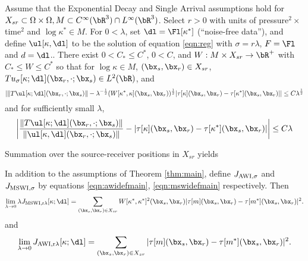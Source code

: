 \begin{theorem}
  \label{thm:main}
  Assume that the Exponential Decay and Single Arrival assumptions
  hold for $X_{sr} \subset \Omega \times \Omega, M \subset C^{\infty}(\bR^3) \cap L^{\infty}(\bR^3)$.
  Select $r >0$ with units of
  pressure$^2 \times$time$^2$ and $\log \kappa^* \in M$. For $0 <
  \lambda $, set
  $\dl=\Fl[\kappa^*]$ (``noise-free data''), and  define $\ul[\kappa,\dl]$
  to be the solution of 
  equation \ref{eqn:reg} with  $\sigma=r\lambda$, $F=\Fl$ and $d=\dl$..
  There exist $0 < C_* \le C^*$, $0 < C$, and $W: M \times X_{sr}
  \rightarrow \bR^+$ with $C_* \le
  W \le C^*$ so that for
  $\log \kappa \in M$, $(\bx_s,\bx_r) \in X_{sr}$, $Tu_{\sigma}[\kappa;\dl](\bx_r,\cdot;\bx_s) \in L^2(\bR)$, and 
  \begin{equation}
    \label{eqn:mswitt}
    |\|T\ul[\kappa;\dl](\bx_r,\cdot;\bx_s)\|- \lambda^{-\frac{1}{2}} (W[\kappa^*,\kappa](\bx_s,\bx_r))^{\frac{1}{2}}|\tau[\kappa](\bx_s,\bx_r)-\tau[\kappa^*](\bx_s,\bx_r)|| \le C
  \lambda^{\frac{1}{2}}
\end{equation}
and for sufficiently small $\lambda$, 
\begin{equation}
  \label{eqn:awitt}
  \left|\frac{\|T\ul[\kappa;\dl](\bx_r,\cdot;\bx_s)\|}{\|\ul[\kappa,\dl](\bx_r,\cdot;\bx_s)\|}-
    |\tau[\kappa](\bx_s,\bx_r)-\tau[\kappa^*](\bx_s,\bx_r)|\right| \le C \lambda
  \end{equation}
\end{theorem}

Summation over the source-receiver positions in $X_{sr}$ yields
\begin{cor}
  \label{thm:cor1}
  In addition to the assumptions of Theorem \ref{thm:main}, define $J_{\rm
    AWI,\sigma}$ and $J_{\rm MSWI,\sigma}$ by equations
  \ref{eqn:awidefmain}, \ref{eqn:mswidefmain} respectively. Then
\begin{equation}
\label{eqn:cor1mswi}   
\lim_{\lambda \rightarrow 0} \lambda J_{\rm MSWI,r\lambda}[\kappa;\dl]
= \sum_{(\bx_s,\bx_r) \in X_{sr}} W[\kappa^*,\kappa^*]^2(\bx_s,\bx_r) |\tau[m](\bx_s,\bx_r) - \tau[m^*](\bx_s,\bx_r)|^2.
\end{equation}
and
\begin{equation}
\label{eqn:cor1awi}   
\lim_{\lambda \rightarrow 0} J_{\rm AWI,r\lambda}[\kappa;\dl]
= \sum_{(\bx_s,\bx_r) \in X_{sr}}  |\tau[m](\bx_s,\bx_r) - \tau[m^*](\bx_s,\bx_r)|^2.
\end{equation}
\end{cor}



